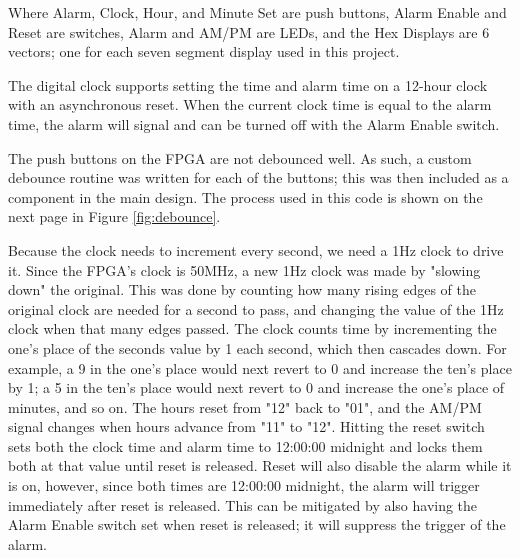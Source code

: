 \documentclass[12pt]{article}
\begin{document}
Where Alarm, Clock, Hour, and Minute Set are push buttons, Alarm Enable and Reset are switches, Alarm and AM/PM are LEDs, and the Hex Displays are 6 vectors; one for each seven segment display used in this project.

\vspace{14.5pt}

The digital clock supports setting the time and alarm time on a 12-hour clock with an asynchronous reset.  When the current clock time is equal to the alarm time, the alarm will signal and can be turned off with the Alarm Enable switch.\par
The push buttons on the FPGA are not debounced well.  As such, a custom debounce routine was written for each of the buttons; this was then included as a component in the main design.  The process used in this code is shown on the next page in Figure \ref{fig:debounce}.

\newpage


Because the clock needs to increment every second, we need a 1Hz clock to drive it.  Since the FPGA's clock is 50MHz, a new 1Hz clock was made by "slowing down" the original.  This was done by counting how many rising edges of the original clock are needed for a second to pass, and changing the value of the 1Hz clock when that many edges passed.  The clock counts time by incrementing the one's place of the seconds value by 1 each second, which then cascades down.  For example, a 9 in the one's place would next revert to 0 and increase the ten's place by 1; a 5 in the ten's place would next revert to 0 and increase the one's place of minutes, and so on.  The hours reset from "12" back to "01", and the AM/PM signal changes when hours advance from "11" to "12".  Hitting the reset switch sets both the clock time and alarm time to 12:00:00 midnight and locks them both at that value until reset is released.  Reset will also disable the alarm while it is on, however, since both times are 12:00:00 midnight, the alarm will trigger immediately after reset is released.  This can be mitigated by also having the Alarm Enable switch set when reset is released; it will suppress the trigger of the alarm.
\end{document}
